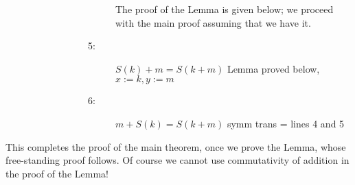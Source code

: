 \documentclass[12pt]{article}
\begin{document}
\begin{description}
\begin{description}
\begin{description}
\begin{description}
The proof of the Lemma is given below; we proceed with the main proof assuming that we have it.

\item[5:]  $S(k)+m = S(k+m)$  Lemma proved below, $x:=k, y:=m$

\item[6:] $m+S(k)=S(k+m)$  symm trans = lines 4 and 5

\end{description}


\end{description}

\end{description}

\end{description}

This completes the proof of the main theorem, once we prove the Lemma, whose free-standing proof follows.
Of course we cannot use commutativity of addition in the proof of the Lemma!
\end{document}
